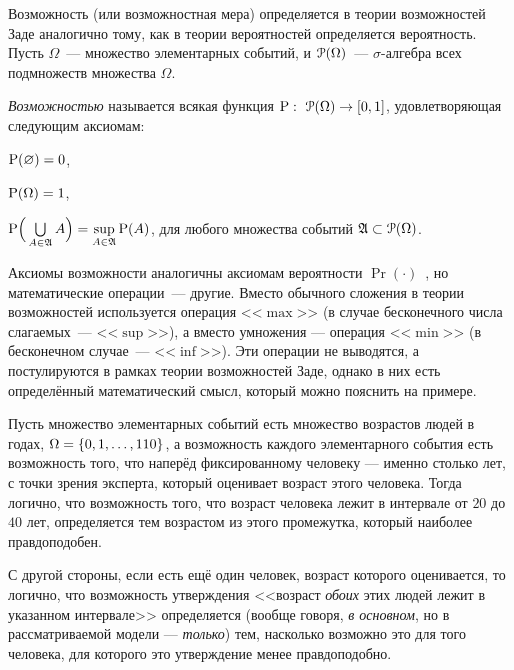 Возможность (или возможностная мера) определяется в теории возможностей Заде \cite{citeZadeh, dubois_prade-1990} аналогично тому, как в теории вероятностей определяется вероятность. Пусть $\Omega$~--- множество элементарных событий, и $\Po(\Omega)$~--- $\sigma$-алгебра всех подмножеств множества $\Omega$.
\begin{definition}
\label{def_possibility}
\emph{Возможностью} называется всякая функция $\P:\ \Po(\Omega)\to[0,1]$, удовлетворяющая следующим аксиомам:
\begin{compactenum}
\item $\P(\varnothing) = 0$,\label{axiom_P1}
\item $\P(\Omega) = 1$,\label{axiom_P2}
\item $\P\Big(\bigcup\limits_{A\in\Alg} A\Big) = \sup\limits_{A\in\Alg}\P(A)$, для любого множества событий $\Alg\subset\Po(\Omega)$.\label{axiom_P3}
\end{compactenum}
\end{definition}

Аксиомы возможности аналогичны аксиомам вероятности $\Pr(\cdot)$~\cite{kolmogorov}, но математические операции~--- другие. Вместо обычного сложения в теории возможностей используется операция <<$\max$>> (в случае бесконечного числа слагаемых~--- <<$\sup$>>), а вместо умножения --- операция <<$\min$>> (в бесконечном случае~--- <<$\inf$>>). Эти операции не выводятся, а постулируются в рамках теории возможностей Заде, однако в них есть определённый математический смысл, который можно пояснить на примере.
\begin{example}
Пусть множество элементарных событий есть множество возрастов людей в годах, $\Om = \{0, 1, \ldots, 110\}$, а возможность каждого элементарного события есть возможность того, что наперёд фиксированному человеку --- именно столько лет, с точки зрения эксперта, который оценивает возраст этого человека.  Тогда логично, что возможность того, что возраст человека лежит в интервале от $20$ до $40$ лет, определяется тем возрастом из этого промежутка, который наиболее правдоподобен. 

С другой стороны, если есть ещё один человек, возраст которого оценивается, то логично, что возможность утверждения <<возраст {\sl обоих} этих людей лежит в указанном интервале>> определяется (вообще говоря, {\sl в основном}, но в рассматриваемой модели --- {\sl только}) тем, насколько возможно это для того человека, для которого это утверждение менее правдоподобно. 
\end{example}

